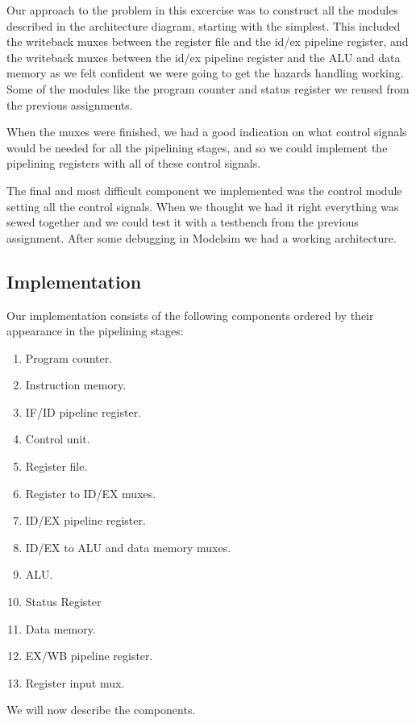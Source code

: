 \documentclass[11pt]{report}
\begin{document}
Our approach to the problem in this excercise was to construct all the 
modules described in the architecture diagram, starting with the simplest.  %
This included the writeback muxes between the register file and the id/ex
pipeline register, and the writeback muxes between the id/ex pipeline 
register and the ALU and data memory as we felt confident we were going 
to get the hazards handling working. 
Some of the modules like the program counter and status register 
we reused from the previous assignments.

When the muxes were finished, we had a good indication on what control
signals would be needed for all the pipelining stages, and so we could 
implement the pipelining registers with all of these control signals.

The final and most difficult component we implemented was the control
module setting all the control signals. When we thought we had it right
everything was sewed together and we could test it with a testbench
from the previous assignment. After some debugging in Modelsim we had 
a working architecture.

\subsection*{Implementation}

Our implementation consists of the following components
ordered by their appearance in the pipelining stages:
	
\begin{enumerate}
\item Program counter.
\item Instruction memory.
\item IF/ID pipeline register.
\item Control unit.
\item Register file.
\item Register to ID/EX muxes.
\item ID/EX pipeline register.
\item ID/EX to ALU and data memory muxes.
\item ALU.
\item Status Register
\item Data memory.
\item EX/WB pipeline register.
\item Register input mux.
\end{enumerate}
	
We will now describe the components.
\end{document}
